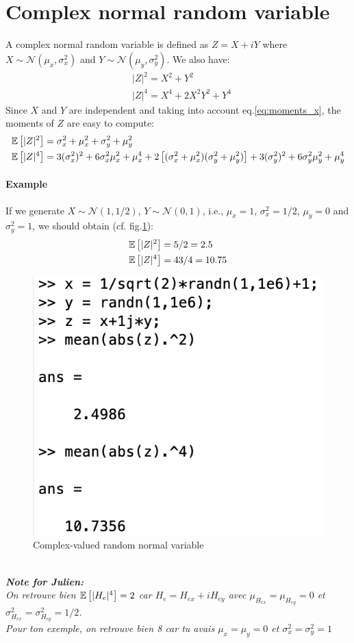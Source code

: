 \documentclass[12pt]{article}
\begin{document}
\section{Complex normal random variable}
A complex normal random variable is defined as $Z = X + iY$ where $X \sim \mathcal{N}(\mu_x,\sigma^2_x)$ and $Y \sim \mathcal{N}(\mu_y,\sigma^2_y)$. We also have:
\begin{equation}
\begin{split}
	&|Z|^2 = X^2 + Y^2\\
	&|Z|^4 = X^4  + 2 X^2 Y^2 + Y^4
\end{split}
\label{eq:deriv_z}
\end{equation}
Since $X$ and $Y$ are independent and taking into account eq.\ref{eq:moments_x}, the moments of $Z$ are easy to compute:
\begin{equation}
\begin{split}
&\mathbb{E} \left[|Z|^2\right] = \sigma_x^2 + \mu_x^2 + \sigma_y^2 + \mu_y^2\\
&\mathbb{E} \left[|Z|^4\right] = 3(\sigma_x^2)^2 + 6 \sigma_x^2 \mu_x^2 + \mu_x^4 + 2\left[ ( \sigma_x^2 + \mu_x^2 )(\sigma_y^2 + \mu_y^2)\right] + 3(\sigma_y^2)^2 + 6 \sigma_y^2 \mu_y^2 + \mu_y^4
\end{split}
\label{eq:moments_z}
\end{equation}


\paragraph*{Example}
If we generate $X \sim \mathcal{N}(1,1/2)$, $Y \sim \mathcal{N}(0,1)$, i.e., $\mu_x = 1$, $\sigma_x^2 = 1/2$, $\mu_y = 0$ and $\sigma_y^2 = 1$, we should obtain (cf. fig.\ref{fig:ex_rv_z}):
\begin{equation}
\begin{split}
&\mathbb{E} \left[|Z|^2\right] = 5/2 = 2.5\\
&\mathbb{E} \left[|Z|^4\right] = 43/4 = 10.75
\end{split}
\label{eq:ex_y}
\end{equation}
\begin{figure}[h!]
	\centering
	\includegraphics[width=.3\linewidth]{img/ex_rv_z.png}
	\caption{Complex-valued random normal variable}
	\label{fig:ex_rv_z}
\end{figure} \\

\textit{\textbf{Note for Julien:}\\
On retrouve bien $\mathbb{E} \left[|H_e|^4\right] = 2$ car $H_e = H_{ex} + iH_{ey}$ avec $\mu_{H_{ex}} = \mu_{H_{ey}} = 0$ et  $\sigma^2_{H_{ex}} = \sigma^2_{H_{ey}} = 1/2$.\\
 Pour ton exemple, on retrouve bien 8 car tu avais $\mu_{x} = \mu_{y} = 0$ et  $\sigma^2_{x} = \sigma^2_{y} = 1$}
\end{document}
